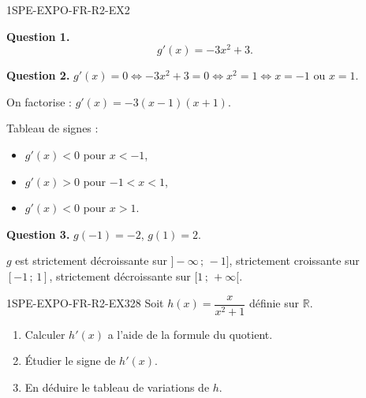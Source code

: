 \begin{corrige}{1SPE-EXPO-FR-R2-EX2}

\textbf{Question 1.}
\[
g'(x) = -3x^2 + 3.
\]

\textbf{Question 2.} $g'(x) = 0 \Leftrightarrow -3x^2 + 3 = 0 \Leftrightarrow x^2 = 1 \Leftrightarrow x = -1$ ou $x = 1$.

On factorise : $g'(x) = -3(x-1)(x+1)$.

Tableau de signes :
\begin{itemize}
  \item $g'(x) < 0$ pour $x < -1$,
  \item $g'(x) > 0$ pour $-1 < x < 1$,
  \item $g'(x) < 0$ pour $x > 1$.
\end{itemize}


\textbf{Question 3.} $g(-1) = -2$, $g(1) = 2$.

$g$ est strictement décroissante sur $]-\infty\,;\,-1]$, strictement croissante sur $[-1\,;\,1]$, strictement décroissante sur $[1\,;\,+\infty[$.

\end{corrige}


\begin{exercice}{1SPE-EXPO-FR-R2-EX3}{2}{8}
Soit $h(x) = \dfrac{x}{x^2 + 1}$ définie sur $\mathbb{R}$.
\begin{enumerate}
  \item Calculer $h'(x)$ a l'aide de la formule du quotient.
  \item Étudier le signe de $h'(x)$.
  \item En déduire le tableau de variations de $h$.
\end{enumerate}
\end{exercice}



